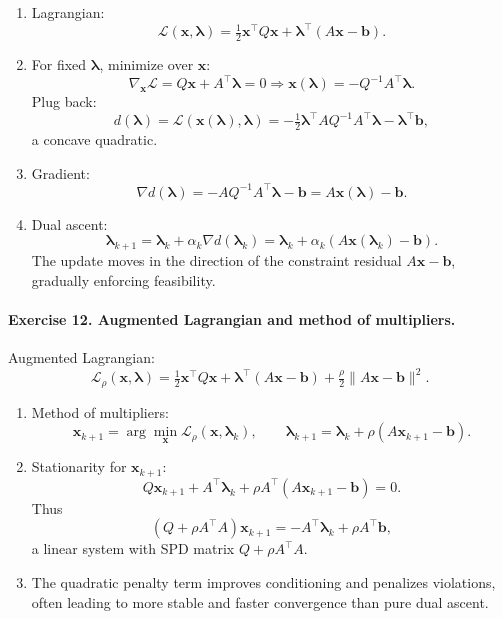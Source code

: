 \documentclass[11pt]{article}
\begin{document}
\begin{enumerate}
\item Lagrangian:
\[
\mathcal{L}(\bm{x},\bm{\lambda})
=
\tfrac12\bm{x}^\top Q\bm{x} + \bm{\lambda}^\top(A\bm{x}-\bm{b}).
\]

\item For fixed $\bm{\lambda}$, minimize over $\bm{x}$:
\[
\nabla_{\bm{x}}\mathcal{L} = Q\bm{x} + A^\top\bm{\lambda} = 0
\Rightarrow
\bm{x}(\bm{\lambda}) = -Q^{-1}A^\top\bm{\lambda}.
\]
Plug back:
\[
d(\bm{\lambda})
= \mathcal{L}(\bm{x}(\bm{\lambda}),\bm{\lambda})
= -\tfrac12 \bm{\lambda}^\top A Q^{-1}A^\top \bm{\lambda} - \bm{\lambda}^\top\bm{b},
\]
a concave quadratic.

\item Gradient:
\[
\nabla d(\bm{\lambda})
= -A Q^{-1}A^\top\bm{\lambda} - \bm{b}
= A\bm{x}(\bm{\lambda}) - \bm{b}.
\]

\item Dual ascent:
\[
\bm{\lambda}_{k+1}
= \bm{\lambda}_k + \alpha_k \nabla d(\bm{\lambda}_k)
= \bm{\lambda}_k + \alpha_k (A\bm{x}(\bm{\lambda}_k) - \bm{b}).
\]
The update moves in the direction of the constraint residual $A\bm{x}-\bm{b}$, gradually enforcing feasibility.
\end{enumerate}

\bigskip

\paragraph{Exercise 12. Augmented Lagrangian and method of multipliers.}

Augmented Lagrangian:
\[
\mathcal{L}_\rho(\bm{x},\bm{\lambda})
=
\tfrac12\bm{x}^\top Q\bm{x}
+ \bm{\lambda}^\top(A\bm{x}-\bm{b})
+ \tfrac{\rho}{2}\|A\bm{x}-\bm{b}\|^2.
\]

\begin{enumerate}
\item Method of multipliers:
\[
\bm{x}_{k+1} = \arg\min_{\bm{x}} \mathcal{L}_\rho(\bm{x},\bm{\lambda}_k),
\qquad
\bm{\lambda}_{k+1} = \bm{\lambda}_k + \rho(A\bm{x}_{k+1}-\bm{b}).
\]

\item Stationarity for $\bm{x}_{k+1}$:
\[
Q\bm{x}_{k+1} + A^\top\bm{\lambda}_k
+ \rho A^\top(A\bm{x}_{k+1}-\bm{b}) = 0.
\]
Thus
\[
(Q+\rho A^\top A)\bm{x}_{k+1}
= -A^\top\bm{\lambda}_k + \rho A^\top\bm{b},
\]
a linear system with SPD matrix $Q+\rho A^\top A$.

\item The quadratic penalty term improves conditioning and penalizes violations, often leading to more stable and faster convergence than pure dual ascent.
\end{enumerate}
\end{document}
